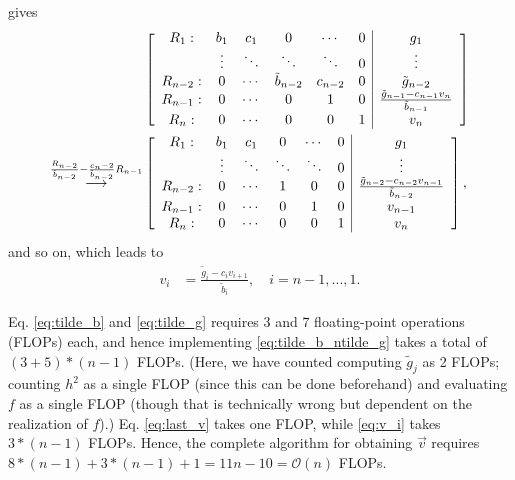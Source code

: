 \documentclass[english,notitlepage,reprint,nofootinbib]{revtex4-2}  %
\begin{document}
\begin{widetext}
gives 
\begin{align}
    &\left[\begin{array}{cccccc|c}
        R_1: & b_1 & c_1 & 0 & \cdots & 0  & g_1\\
        \ & \vdots & \ddots & \ddots & \ddots & 0  & \vdots \\
        R_{n-2}:   & 0 & \cdots & \tilde{b}_{n-2} & c_{n-2} & 0 & \tilde{g}_{n-2} \\
        R_{n-1}: & 0 & \cdots & 0 & 1 & 0 & \frac{\tilde{g}_{n-1} - c_{n-1}v_{n}}{\tilde{b}_{n-1}} \\
        R_{n}: & 0 & \cdots & 0 & 0 & 1 & v_{n}
    \end{array}\right]
    \notag \\
    \overset{\frac{R_{n-2}}{\tilde{b}_{n-2}}-\frac{c_n-2}{\tilde{b}_{n-2}}R_{n-1}}{\longrightarrow} 
    &\left[\begin{array}{cccccc|c}
        R_1: & b_1 & c_1 & 0 & \cdots & 0  & g_1\\
        \ & \vdots & \ddots & \ddots & \ddots & 0  & \vdots \\
        R_{n-2}:   & 0 & \cdots & 1 & 0 & 0 & \frac{\tilde{g}_{n-2} - c_{n-2}v_{n-1}}{\tilde{b}_{n-2}} \\
        R_{n-1}: & 0 & \cdots & 0 & 1 & 0 & v_{n-1} \\
        R_{n}: & 0 & \cdots & 0 & 0 & 1 & v_{n}
    \end{array}\right],
\end{align}
and so on, which leads to  
\begin{align}
    v_{i}   &= \frac{\tilde{g}_{i}-c_{i}v_{i+1}}{\tilde{b}_{i}}, \quad i = n-1, ..., 1.   \label{eq:v_i}
\end{align}
\end{widetext}

Eq. \eqref{eq:tilde_b} and \eqref{eq:tilde_g} requires \(3\) and \(7\) floating-point operations (FLOPs) each, and hence implementing \eqref{eq:tilde_b_ntilde_g} takes a total of \((3+5)*(n-1)\) FLOPs. (Here, we have counted computing \(\tilde{g}_{j}\) as 2 FLOPs; counting \(h^2\) as a single FLOP (since this can be done beforehand) and evaluating \(f\) as a single FLOP (though that is technically wrong but dependent on the realization of \(f\)).) Eq. \eqref{eq:last_v} takes one FLOP, while \eqref{eq:v_i} takes \(3*(n-1)\) FLOPs. Hence, the complete algorithm for obtaining \(\vec{v}\) requires \({8*(n-1) + 3*(n-1) + 1= 11n-10=\mathcal{O}(n)}\) FLOPs.
\end{document}
